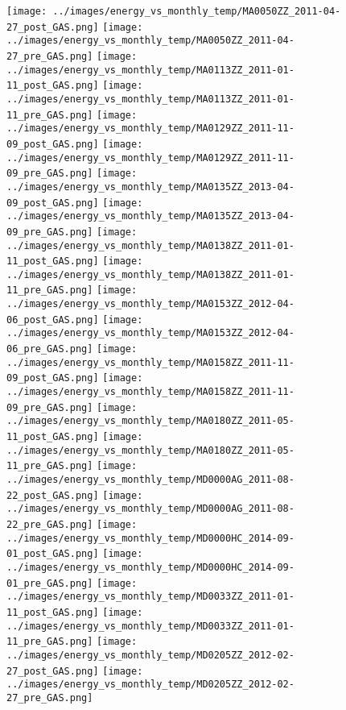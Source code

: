 \clearpage
\begin{figure}
\centering
\texttt{[image: ../images/energy\_vs\_monthly\_temp/MA0050ZZ\_2011-04-27\_post\_GAS.png]}
\texttt{[image: ../images/energy\_vs\_monthly\_temp/MA0050ZZ\_2011-04-27\_pre\_GAS.png]}
\texttt{[image: ../images/energy\_vs\_monthly\_temp/MA0113ZZ\_2011-01-11\_post\_GAS.png]}
\texttt{[image: ../images/energy\_vs\_monthly\_temp/MA0113ZZ\_2011-01-11\_pre\_GAS.png]}
\texttt{[image: ../images/energy\_vs\_monthly\_temp/MA0129ZZ\_2011-11-09\_post\_GAS.png]}
\texttt{[image: ../images/energy\_vs\_monthly\_temp/MA0129ZZ\_2011-11-09\_pre\_GAS.png]}
\texttt{[image: ../images/energy\_vs\_monthly\_temp/MA0135ZZ\_2013-04-09\_post\_GAS.png]}
\texttt{[image: ../images/energy\_vs\_monthly\_temp/MA0135ZZ\_2013-04-09\_pre\_GAS.png]}
\texttt{[image: ../images/energy\_vs\_monthly\_temp/MA0138ZZ\_2011-01-11\_post\_GAS.png]}
\texttt{[image: ../images/energy\_vs\_monthly\_temp/MA0138ZZ\_2011-01-11\_pre\_GAS.png]}
\texttt{[image: ../images/energy\_vs\_monthly\_temp/MA0153ZZ\_2012-04-06\_post\_GAS.png]}
\texttt{[image: ../images/energy\_vs\_monthly\_temp/MA0153ZZ\_2012-04-06\_pre\_GAS.png]}
\texttt{[image: ../images/energy\_vs\_monthly\_temp/MA0158ZZ\_2011-11-09\_post\_GAS.png]}
\texttt{[image: ../images/energy\_vs\_monthly\_temp/MA0158ZZ\_2011-11-09\_pre\_GAS.png]}
\texttt{[image: ../images/energy\_vs\_monthly\_temp/MA0180ZZ\_2011-05-11\_post\_GAS.png]}
\texttt{[image: ../images/energy\_vs\_monthly\_temp/MA0180ZZ\_2011-05-11\_pre\_GAS.png]}
\texttt{[image: ../images/energy\_vs\_monthly\_temp/MD0000AG\_2011-08-22\_post\_GAS.png]}
\texttt{[image: ../images/energy\_vs\_monthly\_temp/MD0000AG\_2011-08-22\_pre\_GAS.png]}
\texttt{[image: ../images/energy\_vs\_monthly\_temp/MD0000HC\_2014-09-01\_post\_GAS.png]}
\texttt{[image: ../images/energy\_vs\_monthly\_temp/MD0000HC\_2014-09-01\_pre\_GAS.png]}
\texttt{[image: ../images/energy\_vs\_monthly\_temp/MD0033ZZ\_2011-01-11\_post\_GAS.png]}
\texttt{[image: ../images/energy\_vs\_monthly\_temp/MD0033ZZ\_2011-01-11\_pre\_GAS.png]}
\texttt{[image: ../images/energy\_vs\_monthly\_temp/MD0205ZZ\_2012-02-27\_post\_GAS.png]}
\texttt{[image: ../images/energy\_vs\_monthly\_temp/MD0205ZZ\_2012-02-27\_pre\_GAS.png]}
\end{figure}
